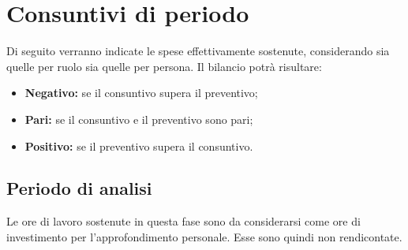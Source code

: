 \section{Consuntivi di periodo}
Di seguito verranno indicate le spese effettivamente sostenute, considerando sia quelle per ruolo sia quelle per persona. Il bilancio potrà risultare:
\begin{itemize}
	\item \textbf{Negativo:} se il consuntivo supera il preventivo;
	\item \textbf{Pari:} se il consuntivo e il preventivo sono pari;
	\item \textbf{Positivo:} se il preventivo supera il consuntivo.
\end{itemize}

\subsection{Periodo di analisi}
Le ore di lavoro sostenute in questa fase sono da considerarsi come ore di investimento per l'approfondimento personale. Esse sono quindi non rendicontate.

